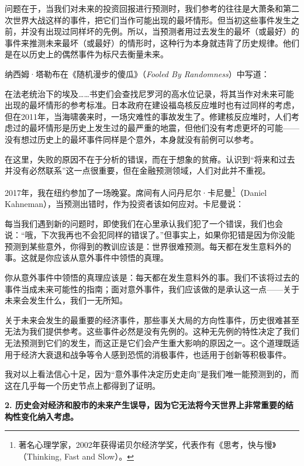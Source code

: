 问题在于，当我们对未来的投资回报进行预测时，我们参考的往往是大萧条和第二次世界大战这样的事件，把它们当作可能出现的最坏情形。但当初这些事件发生之前，并没有出现过同样坏的先例。所以，当预测者用过去发生的最坏（或最好）的事件来推测未来最坏（或最好）的情形时，这种行为本身就违背了历史规律。他们是在以历史上的偶然事件为标尺去衡量未来。

纳西姆·塔勒布在《随机漫步的傻瓜》（\textit{Fooled By Randomness}）中写道：

{\kaishu

在法老统治下的埃及……书吏们会查找尼罗河的高水位记录，将其当作对未来可能出现的最坏情形的参考标准。日本政府在建设福岛核反应堆时也有过同样的考虑，但在2011年，当海啸袭来时，一场灾难性的事故发生了。修建核反应堆时，人们考虑过的最坏情形是历史上发生过的最严重的地震，但他们没有考虑更坏的可能——没有想过历史上的最坏事件同样是个意外，本身就没有前例可以参考。

}

在这里，失败的原因不在于分析的错误，而在于想象的贫瘠。认识到“将来和过去并没有必然联系”这一点很重要，但在金融预测领域，人们对此并不重视。

2017年，我在纽约参加了一场晚宴。席间有人问丹尼尔·卡尼曼\footnote{著名心理学家，2002年获得诺贝尔经济学奖，代表作有《思考，快与慢》（Thinking, Fast and Slow）。}（Daniel Kahneman），当预测出错时，作为投资者该如何应对。卡尼曼说：

{\kaishu

每当我们遇到新的问题时，即使我们在心里承认我们犯了一个错误，我们也会说：“哦，下次我再也不会犯同样的错误了。”但事实上，如果你犯错是因为你没能预测到某些意外，你得到的教训应该是：世界很难预测。每天都在发生意料外的事。这就是你应该从意外事件中领悟的真理。

}

你从意外事件中领悟的真理应该是：每天都在发生意料外的事。我们不该将过去的事件当成未来可能性的指南；面对意外事件，我们应该做的是承认这一点——关于未来会发生什么，我们一无所知。

关于未来会发生的最重要的经济事件，那些事关大局的方向性事件，历史很难甚至无法为我们提供参考。这些事件必然是没有先例的。这种无先例的特性决定了我们无法预测到它们的发生，而这正是它们会产生重大影响的原因之一。这个道理既适用于经济大衰退和战争等令人感到恐慌的消极事件，也适用于创新等积极事件。

我对以上看法信心十足，因为“意外事件决定历史走向”是我们唯一能预测到的，而这在几乎每一个历史节点上都得到了证明。

\textbf{2. 历史会对经济和股市的未来产生误导，因为它无法将今天世界上非常重要的结构性变化纳入考虑。}

